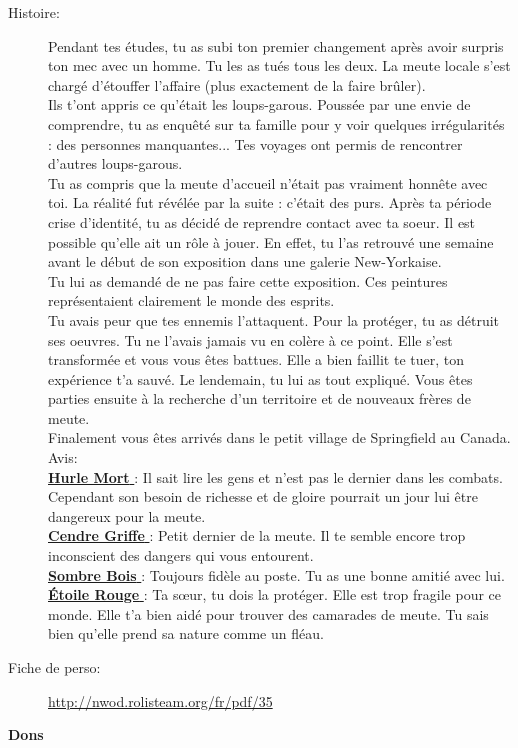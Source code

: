 \documentclass[oneside,12pt]{book}
\newcommand{\Lynn}{\textbf{Étoile Rouge} }
\newcommand{\Luke}{\textbf{Cendre Griffe} }
\newcommand{\Peter}{\textbf{Hurle Mort} }
\newcommand{\Leonard}{\textbf{Sombre Bois} }
\begin{document}
\begin{flushleft}
\begin{description}
\item[Histoire:]{ 
Pendant tes études, tu as subi ton premier changement après avoir surpris ton mec avec un homme. Tu les as tués tous les deux. La meute locale s’est chargé d’étouffer l’affaire (plus exactement de la faire brûler).\\
Ils t’ont appris ce qu’était les loups-garous. Poussée par une envie de comprendre, tu as enquêté sur ta famille pour y voir quelques irrégularités : des personnes manquantes...
Tes voyages ont permis de rencontrer d’autres loups-garous.\\
Tu as compris que la meute d’accueil n’était pas vraiment honnête avec toi. La réalité fut révélée par la suite : c’était des purs. Après ta période crise d’identité, tu as décidé de reprendre contact avec ta soeur. Il est possible qu’elle ait un rôle à jouer. En effet, tu l’as retrouvé une semaine avant le début de son exposition dans une galerie New-Yorkaise.\\
Tu lui as demandé de ne pas faire cette exposition. Ces peintures représentaient clairement le monde des esprits.\\
Tu avais peur que tes ennemis l’attaquent. Pour la protéger, tu as détruit ses oeuvres. Tu ne l’avais jamais vu en colère à ce point. Elle s’est transformée et vous vous êtes battues. Elle a bien faillit te tuer, ton expérience t’a sauvé. Le lendemain, tu lui as tout expliqué. Vous êtes parties ensuite à la recherche d’un territoire et de nouveaux frères de meute.\\
Finalement vous êtes arrivés dans le petit village de Springfield au Canada.\\
Avis:\\
\underline{\Peter} : Il sait lire les gens et n'est pas le dernier dans les combats. Cependant son besoin de richesse et de gloire pourrait un jour lui être dangereux pour la meute. \\
\underline{\Luke} : Petit dernier de la meute. Il te semble encore trop inconscient des dangers qui vous entourent.\\
\underline{\Leonard} : Toujours fidèle au poste. Tu as une bonne amitié avec lui.\\
\underline{\Lynn}: Ta sœur, tu dois la protéger. Elle est trop fragile pour ce monde. Elle t'a bien aidé pour trouver des camarades de meute. Tu sais bien qu'elle prend sa nature comme un fléau.\\
}
\item[Fiche de perso:]{\href{http://nwod.rolisteam.org/fr/pdf/35}{http://nwod.rolisteam.org/fr/pdf/35}}
\end{description}
\clearpage
\textbf{\large Dons} 
\vspace{0.5cm}


\end{flushleft}
\end{document}
